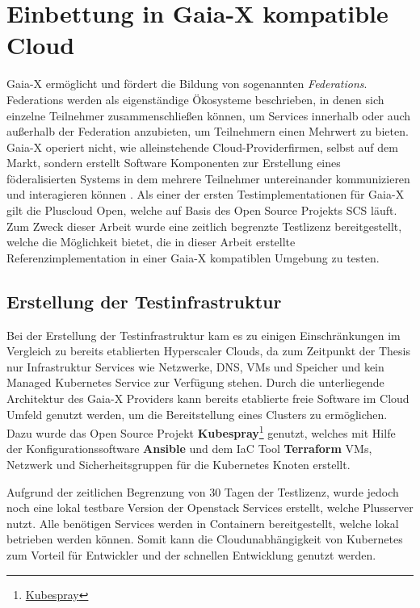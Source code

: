 \chapter{Einbettung in Gaia-X kompatible Cloud}
\label{chapter:gaia-x-einbettung}
Gaia-X ermöglicht und fördert die Bildung von sogenannten \emph{Federations}.
Federations werden als eigenständige Ökosysteme beschrieben, in denen sich einzelne Teilnehmer zusammenschließen können,
um Services innerhalb oder auch außerhalb der Federation anzubieten, um Teilnehmern einen Mehrwert zu bieten.
Gaia-X operiert nicht, wie alleinstehende Cloud-Providerfirmen, selbst auf dem Markt, sondern erstellt
Software Komponenten zur Erstellung eines föderalisierten Systems in dem mehrere Teilnehmer
untereinander kommunizieren und interagieren können \cite{GXFS2021}.
Als einer der ersten Testimplementationen für Gaia-X gilt die Pluscloud Open,
welche auf Basis des Open Source Projekts \ac{SCS} läuft.
Zum Zweck dieser Arbeit wurde eine zeitlich begrenzte Testlizenz bereitgestellt,
welche die Möglichkeit bietet, die in dieser Arbeit erstellte Referenzimplementation
in einer Gaia-X kompatiblen Umgebung zu testen.


\section{Erstellung der Testinfrastruktur}
\label{sec:gaia-x-einbettung:erstellung-testinfra}
Bei der Erstellung der Testinfrastruktur kam es zu einigen Einschränkungen im Vergleich zu bereits etablierten Hyperscaler Clouds,
da zum Zeitpunkt der Thesis nur Infrastruktur Services wie Netzwerke, DNS, \acp{VM} und Speicher
und kein Managed Kubernetes Service zur Verfügung stehen.
Durch die unterliegende Architektur des Gaia-X Providers kann bereits etablierte freie Software
im Cloud Umfeld genutzt werden, um die Bereitstellung eines Clusters zu ermöglichen.
Dazu wurde das Open Source Projekt \textbf{Kubespray}\footnote{\href{https://github.com/kubernetes-sigs/kubespray}{Kubespray}} genutzt,
welches mit Hilfe der Konfigurationssoftware \textbf{Ansible} und dem \ac{IaC} Tool \textbf{Terraform}
\acp{VM}, Netzwerk und Sicherheitsgruppen für die Kubernetes Knoten erstellt.

Aufgrund der zeitlichen Begrenzung von 30 Tagen der Testlizenz, wurde jedoch noch eine lokal
testbare Version der Openstack Services erstellt, welche Plusserver nutzt.
Alle benötigen Services werden in Containern bereitgestellt, welche lokal 
betrieben werden können.
Somit kann die Cloudunabhängigkeit von Kubernetes zum Vorteil für Entwickler und der schnellen Entwicklung genutzt werden.


